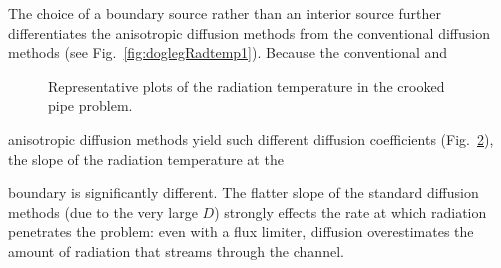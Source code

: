 The choice of a boundary source rather than an interior source further
differentiates the anisotropic diffusion methods from the conventional diffusion
methods (see Fig.~\ref{fig:doglegRadtemp1}). Because the conventional and
%
\begin{figure}[htb]
  \centering\small
  \subfloat[Leg 1 at $t=0.5$]{%
    \hspace{-.25in}%
    
    \label{fig:doglegRadtemp1}
  }%
  \subfloat[Leg 2 at $t=2.0$]{%
    \hspace{-.25in}%
    
    \label{fig:doglegRadtemp2}
  }%
  \caption{Representative plots of the radiation temperature in the crooked
  pipe problem.}
  \label{fig:doglegRadtemp}
\end{figure}
%
anisotropic diffusion methods yield such different diffusion coefficients
(Fig.~\ref{fig:doglegDcoeff}), the slope of the radiation temperature at the
%
\begin{figure}[htb]
  \centering\small
  \subfloat[Leg 1]{%
    \hspace{-.25in}%
    
  }%
  \subfloat[Leg 2]{%
    \hspace{-.25in}%
    
  }%
  \label{fig:doglegDcoeff}
\end{figure}
%
boundary is significantly different. The flatter slope of the standard
diffusion methods (due to the very large $D$) strongly effects the rate at which
radiation penetrates the problem: even with a flux limiter, diffusion
overestimates the amount of radiation that streams through the channel.

